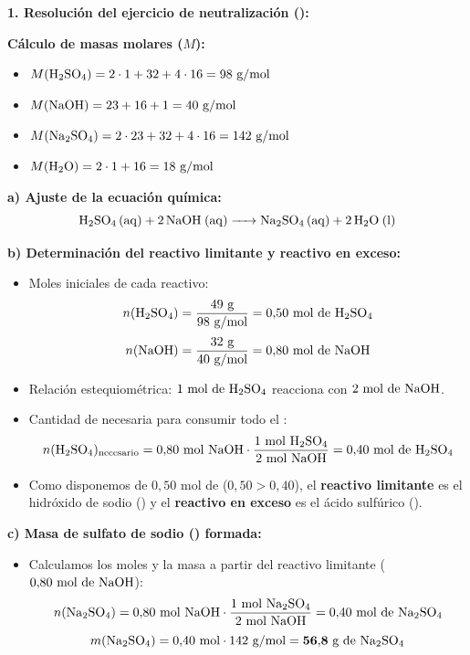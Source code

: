 ﻿\documentclass[11pt,a4paper]{article}
\begin{document}
\pagestyle{empty}

\noindent\textbf{1. Resolución del ejercicio de neutralización ():}

\vspace{0.2cm}
\noindent\textbf{Cálculo de masas molares ($M$):}
\begin{itemize}[leftmargin=1.5em, itemsep=2pt]
    \item $M(\ce{H2SO4}) = 2 \cdot 1 + 32 + 4 \cdot 16 = 98\text{ g/mol}$
    \item $M(\ce{NaOH}) = 23 + 16 + 1 = 40\text{ g/mol}$
    \item $M(\ce{Na2SO4}) = 2 \cdot 23 + 32 + 4 \cdot 16 = 142\text{ g/mol}$
    \item $M(\ce{H2O}) = 2 \cdot 1 + 16 = 18\text{ g/mol}$
\end{itemize}

\vspace{0.2cm}
\noindent\textbf{a) Ajuste de la ecuación química:}
\[
\ce{H2SO4 (aq) + 2 NaOH (aq) -> Na2SO4 (aq) + 2 H2O (l)}
\]

\vspace{0.1cm}
\noindent\textbf{b) Determinación del reactivo limitante y reactivo en exceso:}
\begin{itemize}[leftmargin=1.5em, itemsep=3pt]
    \item Moles iniciales de cada reactivo:
    \[
    n(\ce{H2SO4}) = \frac{49\text{ g}}{98\text{ g/mol}} = 0{,}50\text{ mol de \ce{H2SO4}}
    \]
    \[
    n(\ce{NaOH}) = \frac{32\text{ g}}{40\text{ g/mol}} = 0{,}80\text{ mol de \ce{NaOH}}
    \]
    \item Relación estequiométrica: $1\text{ mol de \ce{H2SO4}}$ reacciona con $2\text{ mol de \ce{NaOH}}$.
    \item Cantidad de  necesaria para consumir todo el :
    \[
    n(\ce{H2SO4})_{\text{necesario}} = 0{,}80\text{ mol \ce{NaOH}} \cdot \frac{1\text{ mol \ce{H2SO4}}}{2\text{ mol \ce{NaOH}}} = 0{,}40\text{ mol de \ce{H2SO4}}
    \]
    \item Como disponemos de $0{,}50\text{ mol}$ de  ($0{,}50 > 0{,}40$), el \textbf{reactivo limitante} es el hidróxido de sodio () y el \textbf{reactivo en exceso} es el ácido sulfúrico ().
\end{itemize}

\vspace{0.1cm}
\noindent\textbf{c) Masa de sulfato de sodio () formada:}
\begin{itemize}[leftmargin=1.5em, itemsep=3pt]
    \item Calculamos los moles y la masa a partir del reactivo limitante ($0{,}80\text{ mol de \ce{NaOH}}$):
    \[
    n(\ce{Na2SO4}) = 0{,}80\text{ mol \ce{NaOH}} \cdot \frac{1\text{ mol \ce{Na2SO4}}}{2\text{ mol \ce{NaOH}}} = 0{,}40\text{ mol de \ce{Na2SO4}}
    \]
    \[
    m(\ce{Na2SO4}) = 0{,}40\text{ mol} \cdot 142\text{ g/mol} = \mathbf{56{,}8\text{ g de \ce{Na2SO4}}}
    \]
\end{itemize}
\end{document}
